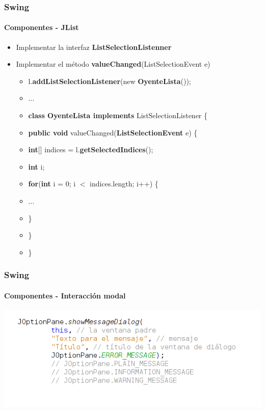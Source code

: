\documentclass{beamer}
\begin{document}
    \begin{frame}
		\frametitle{Swing}
		\framesubtitle{Componentes - JList}

        \begin{itemize}
		    \item[\checkmark] Implementar la interfaz \textbf{ListSelectionListenner}
		    \item[\checkmark] Implementar el m\'etodo \textbf{valueChanged}(ListSelectionEvent e)
		    \begin{itemize}
        		    \item[] l.\textbf{addListSelectionListener}(new \textbf{OyenteLista}());
	    	        \item[] ...
    	    	        \item[] \textbf{class OyenteLista implements} ListSelectionListener \{
	    	        \item[] \hspace{10pt} \textbf{public void} valueChanged(\textbf{ListSelectionEvent} e) \{
	    	        \item[] \hspace{20pt} \textbf{int}[] indices = l.\textbf{getSelectedIndices}();
	    	        \item[] \hspace{20pt} \textbf{int} i;
	    	        \item[] \hspace{20pt} \textbf{for}(\textbf{int} i = 0; i $<$ indices.length; i++) \{
                \item[] \hspace{30pt} ...
                \item[] \hspace{20pt} \}
                \item[] \hspace{10pt} \}
                \item[] \}   
            \end{itemize}
		\end{itemize}
	\end{frame}	

    \begin{frame}
		\frametitle{Swing}
		\framesubtitle{Componentes - Interacci\'on modal}

        \begin{center}
	        	\includegraphics[scale=.7]{images/dialog.png}
	    \end{center}
	\end{frame}	
\end{document}
